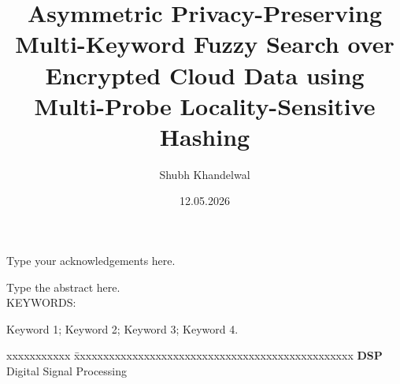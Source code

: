 \documentclass[BTech]{iiitdmdiss}
\begin{document}
\title{Asymmetric Privacy-Preserving Multi-Keyword Fuzzy Search over Encrypted Cloud Data using Multi-Probe Locality-Sensitive Hashing}
\author{Shubh Khandelwal}
\date{12.05.2026}

\maketitle

\declaration


\certificate
\acknowledgements

Type your acknowledgements here.

\abstract

Type the abstract here.
\\
\vspace{10pt}
\noindent KEYWORDS: \hspace*{0.5em} \parbox[t]{4.4in}{Keyword 1; Keyword 2; Keyword 3; Keyword 4.}


\pagebreak


\begin{singlespace}
\tableofcontents
\thispagestyle{empty}

\listoftables
{}
\listoffigures
{}
\end{singlespace}


\abbreviations

\noindent 
\begin{tabbing}
xxxxxxxxxxx \= xxxxxxxxxxxxxxxxxxxxxxxxxxxxxxxxxxxxxxxxxxxxxxxx \kill
\textbf{DSP}   \> Digital Signal Processing\\

\end{tabbing}
\end{document}
